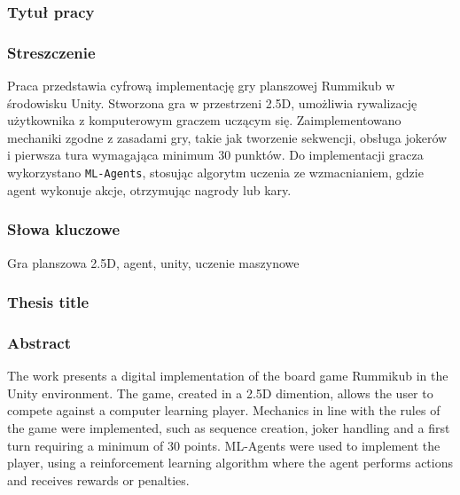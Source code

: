 \documentclass[a4paper,twoside,12pt]{book}
\begin{document}
	
	
	\cleardoublepage
	
	\rmfamily\normalfont
	\pagestyle{empty}
	
	
	
	\subsubsection*{Tytuł pracy} 
	\Title
	
	\subsubsection*{Streszczenie} 
	Praca przedstawia cyfrową implementację gry planszowej Rummikub w środowisku Unity. Stworzona gra w przestrzeni 2.5D, umożliwia rywalizację użytkownika z komputerowym graczem uczącym się. Zaimplementowano mechaniki zgodne z zasadami gry, takie jak tworzenie sekwencji, obsługa jokerów i pierwsza tura wymagająca minimum 30 punktów. Do implementacji gracza wykorzystano \texttt{ML-Agents}, stosując algorytm uczenia ze wzmacnianiem, gdzie agent wykonuje akcje, otrzymując nagrody lub kary.
	
	\subsubsection*{Słowa kluczowe} 
	Gra planszowa 2.5D, agent, unity, uczenie maszynowe
	
	\subsubsection*{Thesis title} 
	\begin{otherlanguage}{british}
		\TitleAlt
	\end{otherlanguage}
	
	\subsubsection*{Abstract} 
	\begin{otherlanguage}{british}
		The work presents a digital implementation of the board game Rummikub in the Unity environment. The game, created in a 2.5D dimention, allows the user to compete against a computer learning player. Mechanics in line with the rules of the game were implemented, such as sequence creation, joker handling and a first turn requiring a minimum of 30 points. ML-Agents were used to implement the player, using a reinforcement learning algorithm where the agent performs actions and receives rewards or penalties.
		
	\end{otherlanguage}
\end{document}
